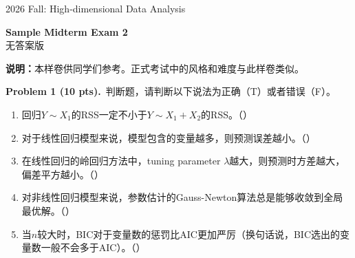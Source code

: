 \documentclass[UTF8,a4paper,11pt,fontset=fandol]{ctexart}
\newcommand{\blank}{\mbox{（\hspace{1.5em}）}}
\newcommand{\problem}[2]{\par\addvspace{10pt}\Needspace{5\baselineskip}\textbf{Problem #1 (#2 pts).}\ }
\newcommand{\examheader}[2]{%
  {\large #1 Fall: High-dimensional Data Analysis}\par
  \vspace{6pt}
  \begin{center}{\Large\bfseries #2}\\[3pt]{\small 无答案版}\end{center}
  \vspace{2pt}}
\begin{document}
\examheader{2026}{Sample Midterm Exam 2}
\textbf{说明：}本样卷供同学们参考。正式考试中的风格和难度与此样卷类似。

\problem{1}{10}判断题，请判断以下说法为正确（T）或者错误（F）。
\begin{enumerate}
  \item 回归$Y\sim X_1$的RSS一定不小于$Y\sim X_1+X_2$的RSS。\blank
  \item 对于线性回归模型来说，模型包含的变量越多，则预测误差越小。\blank
  \item 在线性回归的岭回归方法中，tuning parameter $\lambda$越大，则预测时方差越大，偏差平方越小。\blank
  \item 对非线性回归模型来说，参数估计的Gauss-Newton算法总是能够收敛到全局最优解。\blank
  \item 当$n$较大时，BIC对于变量数的惩罚比AIC更加严厉（换句话说，BIC选出的变量数一般不会多于AIC）。\blank
\end{enumerate}
\end{document}
